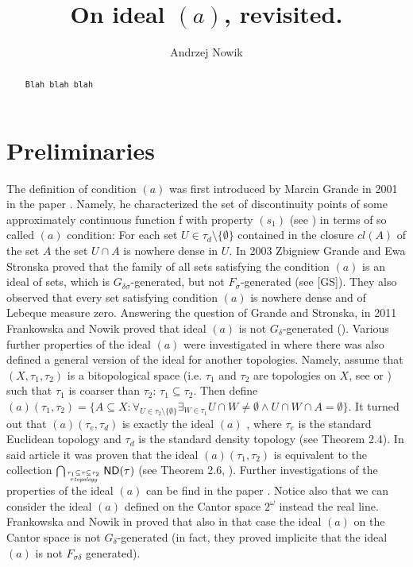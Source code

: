 \documentclass[12pt]{amsart}
\author{Andrzej Nowik}
\theoremstyle{plain}
\theoremstyle{definition}
\theoremstyle{remark}
\newcommand{\cl}{\mathit{cl}}
\newcommand{\dummy}{{\tt Blah blah blah}}
\newcommand{\aideal}{\mathit{(a)}}
\newcommand{\topWithoutEmptyset}[1]{#1\setminus\lbrace\emptyset\rbrace}
\begin{document}
\title[
On ideal $(a)$, revisited.
]{
On ideal $(a)$, revisited.
}

\begin{abstract}
\dummy
\end{abstract}

\maketitle

\section{Preliminaries}
The definition of condition $(a)$ was first introduced by Marcin Grande in 2001 in the paper
\cite{MarcinGrande}. Namely, he characterized the set of discontinuity points of some approximately continuous function f with property
$(s_1)$ (see \cite{MarcinGrande}) in terms of so called $(a)$ condition:
For each set $U\in\tau_d\setminus\lbrace\emptyset\rbrace$ contained in the closure $\cl(A)$ of the set $A$ the
set $U \cap A$ is nowhere dense in $U$.
In 2003 Zbigniew Grande and Ewa Stronska proved that the family of all sets satisfying
the condition $(a)$ is an ideal of sets, which is $G_{\delta\sigma}$-generated, but not 
$F_{\sigma}$-generated 
(see [GS]). They also observed that every set satisfying condition $(a)$ is nowhere dense
and of Lebeque measure zero. Answering the question of Grande and Stronska,
in 2011 Frankowska and Nowik proved that ideal $(a)$ is not $G_{\delta}$-generated (\cite{FN2}).
Various further properties of the ideal $(a)$ were investigated in \cite{N}
where there was also defined a general version of the ideal for another
topologies. Namely, assume
that $(X, \tau_1,\tau_2)$ is a bitopological space 
(i.e. $\tau_1$ and $\tau_2$ are topologies on $X$, 
see \cite{D} or )
such that $\tau_1$ is coarser than $\tau_2$:
$\tau_1 \subseteq \tau_2$. Then 
define $\aideal(\tau_1, \tau_2) = \{ A \subseteq X \colon
\forall_{U \in \topWithoutEmptyset{\tau_2}}
\exists_{W \in \tau_1} U \cap W \not= \emptyset \wedge
U \cap W \cap A = \emptyset\}$.
It turned out that $\aideal(\tau_e, \tau_d)$ is exactly the ideal $(a)$
, where $\tau_e$ is the standard Euclidean topology and 
$\tau_d$ is the standard density topology (see \cite{N} Theorem 2.4).
In said article it was proven that the ideal $\aideal(\tau_1, \tau_2)$
is equivalent to the collection 
$\bigcap_{\tau_1 \subseteq \tau \subseteq \tau_2 \atop \tau \hbox{\tiny \it
topology}} \mathsf{ND}(\tau)$ (see Theorem 2.6, \cite{N}).
Further investigations of the properties of the ideal $(a)$ can be find in the paper  
\cite{FG}.
Notice also that we can consider the ideal $(a)$ defined on the Cantor
space $2^{\omega}$ instead the real line. 
Frankowska and Nowik in \cite{FN1} proved that also in that case
the ideal $(a)$ on the Cantor space is 
not $G_{\delta}$-generated (in fact, they proved implicite that the ideal $(a)$ is not
$F_{\sigma\delta}$ generated).
\end{document}

